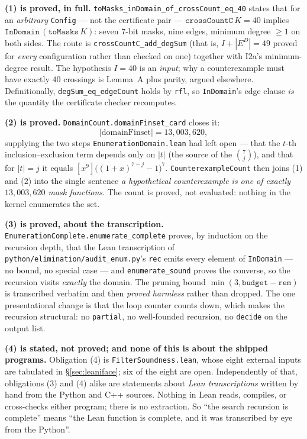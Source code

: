 \documentclass[11pt,a4paper]{article}
\theoremstyle{plain}
\theoremstyle{definition}
\theoremstyle{remark}
\newcommand{\ED}{E^{D}}
\begin{document}
\textbf{(1) is proved, in full.} \texttt{toMasks\_inDomain\_of\_crossCount\_eq\_40}
states that for an \emph{arbitrary} \texttt{Config} --- not the certificate pair
--- $\texttt{crossCountC}\,K = 40$ implies $\texttt{InDomain}\,(\texttt{toMasks}\,K)$:
seven $7$-bit masks, nine edges, minimum degree $\ge 1$ on both sides. The route
is \texttt{crossCountC\_add\_degSum} (that is, $I+|\ED|=49$ proved for
\emph{every} configuration rather than checked on one) together with
\textsf{I2a}'s minimum-degree result. The hypothesis $I=40$ is an \emph{input};
why a counterexample must have exactly $40$ crossings is Lemma~A plus parity,
argued elsewhere. Definitionally, \texttt{degSum\_eq\_edgeCount} holds by
\texttt{rfl}, so \texttt{InDomain}'s edge clause \emph{is} the quantity the
certificate checker recomputes.

\textbf{(2) is proved.} \texttt{DomainCount.domainFinset\_card} closes it:
\[
  |\text{domainFinset}| = 13{,}003{,}620 ,
\]
supplying the two steps \texttt{EnumerationDomain.lean} had left open --- that
the $t$-th inclusion--exclusion term depends only on $|t|$ (the source of the
$\binom{7}{j}$), and that for $|t|=j$ it equals
$[x^9]\bigl((1+x)^{7-j}-1\bigr)^{7}$. \texttt{CounterexampleCount} then joins
(1) and (2) into the single sentence \emph{a hypothetical counterexample is one
of exactly $13{,}003{,}620$ mask functions}. The count is proved, not evaluated:
nothing in the kernel enumerates the set.

\textbf{(3) is proved, about the transcription.}
\texttt{EnumerationComplete.enumerate\_complete} proves, by induction on the
recursion depth, that the Lean transcription of
\texttt{python/elimination/audit\_enum.py}'s \texttt{rec} emits every element of
\texttt{InDomain} --- no bound, no special case --- and
\texttt{enumerate\_sound} proves the converse, so the recursion visits
\emph{exactly} the domain. The pruning bound $\min(3,\texttt{budget}-\texttt{rem})$
is transcribed verbatim and then \emph{proved harmless} rather than dropped. The
one presentational change is that the loop counter counts down, which makes the
recursion structural: no \texttt{partial}, no well-founded recursion, no
\texttt{decide} on the output list.

\textbf{(4) is stated, not proved; and none of this is about the shipped
programs.} Obligation (4) is \texttt{FilterSoundness.lean}, whose eight external
inputs are tabulated in \S\ref{sec:leaniface}; six of the eight are open.
Independently of that, obligations (3) and (4) alike are statements about
\emph{Lean transcriptions} written by hand from the Python and C++ sources.
Nothing in Lean reads, compiles, or cross-checks either program; there is no
extraction. So ``the search recursion is complete'' means ``the Lean function is
complete, and it was transcribed by eye from the Python''.
\end{document}
